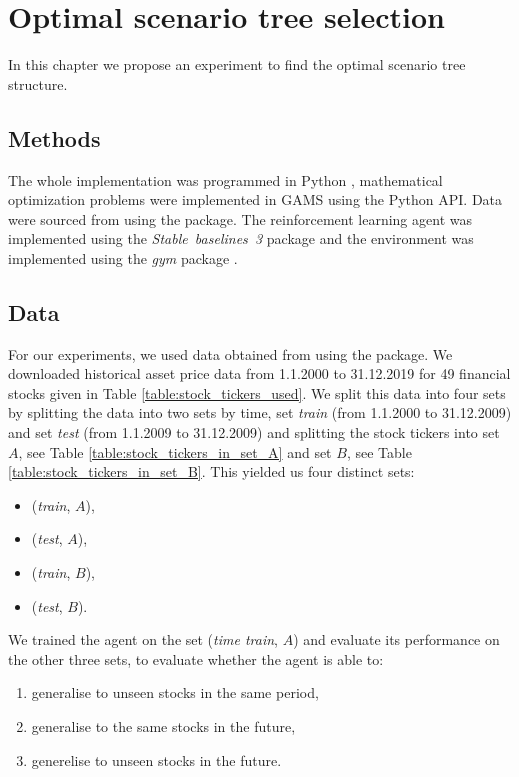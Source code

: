 \chapter{Optimal scenario tree selection}
\label{chapter4}
In this chapter we propose an experiment to find the optimal scenario tree structure.
\section{Methods}
The whole implementation was programmed in Python \cite[Version 3.11]{python}, mathematical optimization problems were implemented in GAMS \cite[version]{GAMS}  using the Python API. Data were sourced from \cite{yahoo} using the \cite[version 0.1.74]{yfinance} package. The reinforcement learning agent was implemented using the \textit{Stable~baselines~3} package \cite[version 1.6.2]{stable_baselines3} and the environment was implemented using the \textit{gym} package \cite[version 0.21.0]{openai_gym}.

\section{Data}
For our experiments, we used data obtained from \cite{yahoo} using the \cite[version 0.1.74]{yfinance} package. We downloaded historical asset price data from 1.1.2000 to 31.12.2019 for 49 financial stocks given in Table \ref{table:stock_tickers_used}. We split this data into four sets by splitting the data into two sets by time, set \textit{train} (from 1.1.2000 to 31.12.2009) and set \textit{test} (from 1.1.2009 to 31.12.2009) and splitting the stock tickers into set $A$, see Table \ref{table:stock_tickers_in_set_A} and set $B$, see Table \ref{table:stock_tickers_in_set_B}. This yielded us four distinct sets:
\begin{itemize}
\item (\textit{train}, $A$),
\item (\textit{test}, $A$),
\item (\textit{train}, $B$),
\item (\textit{test}, $B$).
\end{itemize}
We trained the agent on the set (\textit{time train}, $A$) and evaluate its performance on the other three sets, to evaluate whether the agent is able to:
\begin{enumerate}
\item generalise to unseen stocks in the same period,
\item generalise to the same stocks in the future,
\item generelise to unseen stocks in the future.
\end{enumerate}

